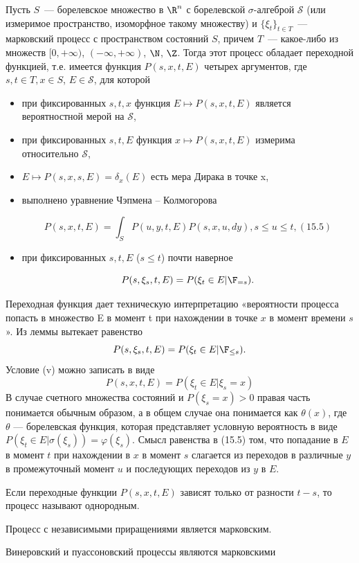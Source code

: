 \begin{theorem}
    Пусть $S$~--- борелевское множество в $\R^n$ с борелевской $\sigma$-алгеброй $\mathcal{S}$ (или измеримое пространство, изоморфное такому множеству) и $\{\xi_t\}_{t \in T}$~--- марковский процесс с пространством состояний $S$, причем $T$~--- какое-либо из множеств $[0, +\infty)$, $(−\infty, +\infty)$, $\N$, $\Z$. Тогда этот процесс обладает переходной функцией, т.е. имеется функция $P(s, x, t, E)$ четырех аргументов, где $s, t \in T, x \in S$, $E \in \mathcal{S}$, для которой
    \begin{itemize}
        \item[(i)] при фиксированных $s, t, x$ функция $E \mapsto P(s, x, t, E)$ является вероятностной мерой на $\mathcal{S}$,
        \item [(ii)] при фиксированных $s, t, E$ функция $x \mapsto P(s, x, t, E)$ измерима относительно $\mathcal{S}$,
        \item[(iii)] $E \mapsto P(s, x, s, E) = \delta_x(E)$ есть мера Дирака в точке x,
        \item[(iv)] выполнено уравнение Чэпмена – Колмогорова

        \[ P(s, x, t, E) = \int_S P(u, y, t, E)P(s, x, u, dy), s \leq u \leq t, (15.5) \]
        \item[(v)] при фиксированных $s, t, E$ ($s \leq t$) почти наверное
        
        \[ P(s, \xi_s, t, E) = P(\xi_t \in E|\F_{=s}). \]
    \end{itemize}
\end{theorem}

\begin{note}
    Переходная функция дает техническую интерпретацию «вероятности процесса попасть в множество E в момент t при нахождении в точке $x$ в момент времени $s$».
    Из леммы вытекает равенство
    \[ P(s, \xi_s, t, E) = P(\xi_t \in E|\F_{\leq s}). \]
    Условие (v) можно записать в виде
    \[ P(s, x, t, E) = P(\xi_t \in E|\xi_s = x) \]
    В случае счетного множества состояний и $P(\xi_s = x) > 0$ правая часть понимается обычным образом, а в общем случае она понимается как $\theta(x)$, где $\theta$ — борелевская функция, которая представляет условную вероятность в виде $P(\xi_t \in E|\sigma(\xi_s)) = \varphi(\xi_s)$.
    Смысл равенства в (15.5) том, что попадание в $E$ в момент $t$ при нахождении в $x$ в момент $s$ слагается из переходов в различные $y$ в промежуточный момент $u$ и последующих переходов из $y$ в $E$.
\end{note}

\begin{definition}
    Если переходные функции $P(s, x, t, E)$ зависят только от разности $t - s$, то процесс называют однородным.
\end{definition}

\begin{theorem}
    Процесс с независимыми приращениями является марковским.
\end{theorem}

\begin{corollary}
    Винеровский и пуассоновский процессы являются марковскими
\end{corollary}
